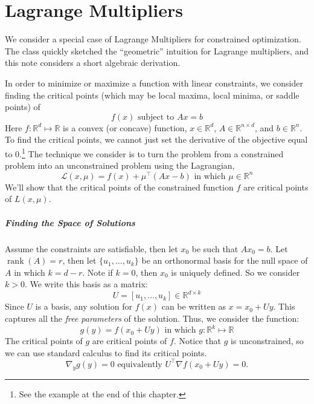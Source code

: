 \titlespacing*{\chapter}{0pt}{-10pt}{20pt}
\chapter{Lagrange Multipliers}\label{cha:lagrange}


We consider a special case of Lagrange Multipliers for constrained
optimization. The class quickly sketched the ``geometric'' intuition for
Lagrange multipliers, and this note considers a short algebraic derivation.

In order to minimize or maximize a function with linear constraints, we consider
finding the critical points (which may be local maxima, local minima, or saddle
points) of
\[
    f(x) \text{ subject to } Ax = b
\]
Here $f : \mathbb R^d \mapsto \mathbb R$ is a convex (or concave) function, $x \in \mathbb R^d$, $A \in \mathbb R^{n \times d}$, and
$b \in \mathbb R^n$. To find the critical points, we cannot just set the derivative of the
objective equal to $0$.\footnote{See the example at the end of this chapter.} The technique we consider is to turn the problem from a
constrained problem into an unconstrained problem using the Lagrangian,
\[
    \mathcal L(x,\mu) = f(x) + \mu^\top (Ax - b) \text{ in which } \mu \in \mathbb R^n
\]
We'll show that the critical points of the constrained function $f$ are critical
points of $L(x,\mu)$.


\paragraph{Finding the Space of Solutions} Assume the constraints are satisfiable,
then let $x_0$ be such that $Ax_0 = b$. Let $\operatorname{rank}(A) = r$, then let $\{u_1 ,\ldots,u_k\}$ be an
orthonormal basis for the null space of $A$ in which $k = d-r$. Note if $k = 0$, then
$x_0$ is uniquely defined. So we consider $k > 0$. We write this basis as a matrix:
\[
    U = [u_1 ,\ldots, u_k] \in \mathbb R^{d \times k}
\]
Since $U$ is a basis, any solution for $f(x)$ can be written as $x = x_0 + Uy$. This
captures all the \textit{free parameters} of the solution. Thus, we consider the function:
\[
    g(y) = f(x_0 + Uy) \text{ in which } g : \mathbb R^k \mapsto \mathbb R
\]
The critical points of $g$ are critical points of $f$. Notice that $g$ is unconstrained,
so we can use standard calculus to find its critical points.
\[
    \nabla_y g(y) = 0 \text{ equivalently } U^\top \nabla f(x_0 + Uy) = 0.
\]

